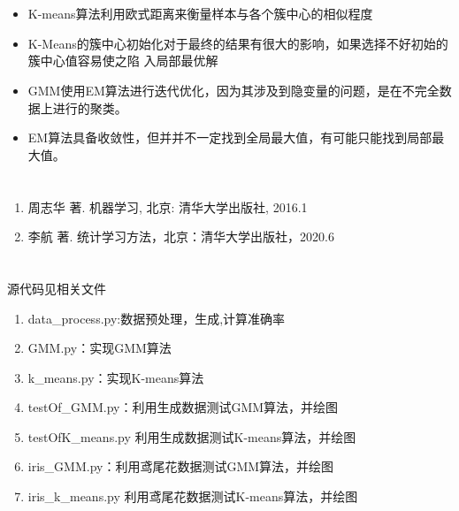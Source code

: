 \documentclass[lang=cn,a4paper,cite=authoryear]{elegantpaper}
\begin{document}
\section*{}
\begin{itemize}
	\item  K-means算法利用欧式距离来衡量样本与各个簇中心的相似程度
	\item K-Means的簇中心初始化对于最终的结果有很大的影响，如果选择不好初始的簇中心值容易使之陷
	入局部最优解
	\item GMM使用EM算法进行迭代优化，因为其涉及到隐变量的问题，是在不完全数据上进行的聚类。
	\item EM算法具备收敛性，但并并不一定找到全局最大值，有可能只能找到局部最大值。
\end{itemize}
\section*{}
\begin{enumerate}[(1)]
	\item  周志华 著. 机器学习, 北京: 清华大学出版社, 2016.1
	\item  李航 著. 统计学习方法，北京：清华大学出版社，2020.6
\end{enumerate}
\section*{}
源代码见相关文件
\begin{enumerate}[(1)]
	\item  data\_process.py:数据预处理，生成,计算准确率
	\item  GMM.py：实现GMM算法
	\item  k\_means.py：实现K-means算法
	\item  testOf\_GMM.py：利用生成数据测试GMM算法，并绘图
	\item  testOfK\_means.py 利用生成数据测试K-means算法，并绘图
	\item  iris\_GMM.py：利用鸢尾花数据测试GMM算法，并绘图
	\item  iris\_k\_means.py 利用鸢尾花数据测试K-means算法，并绘图
\end{enumerate}
\end{document}
